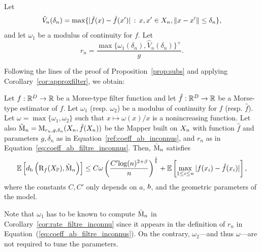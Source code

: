 Let 
\begin{equation}
\hat V_n(\delta_n)=\max\{|\hat f(x)-\hat f(x')|\, :\, x,x'\in X_n, \|x-x'\|\leq\delta_n\},
\end{equation}
 and let
$\omega_1$ be a modulus of continuity for $f$. Let 
\begin{equation}\label{eq:coeff_ab_filtre_inconnus}
r_n=\frac{\max\{\omega_1(\delta_n),\hat V_n(\delta_n)\}^+}{g}.
\end{equation}

Following the lines of the proof of Proposition~\ref{prop:subs} and applying Corollary~\ref{cor:approxfilter}, we obtain:

\begin{cor}\label{cor:rate_filtre_inconnu}
Let $f:\mathbb{R}^D \rightarrow \mathbb{R} $ be a Morse-type filter function  and let $\hat f: \mathbb{R}^D \rightarrow \mathbb{R}$ be a Morse-type estimator of $f$. 
Let  $\omega_1$  (resp. $\omega_2$) be a modulus of continuity for $f$ (resp. $\hat f$).
Let $\omega=\max\{\omega_1,\omega_2\}$ such that 
$x\mapsto \omega(x)/x$ is a nonincreasing function. 
Let also  $\hat{\mathrm{M}}_n  =   \mathrm{M}_{r_n,g,\delta_n} (X_n, \hat f(X_n))$  be the Mapper built on $X_n$ 
with function $\hat f$  and parameters $g,\delta_n$  as in Equation~\eqref{ref:coeff_ab_inconnus},
and $r_n$ as in Equation~\eqref{eq:coeff_ab_filtre_inconnus}. 
Then, $\hat{\mathrm{M}}_n$ satisfies
\begin{equation*}
\label{risk_estimated_filter}
 \mathbb{E}\left[  d_{\rm b}\left(\mathrm{R}_f(X_{\mathbb{P}}),  \hat{\mathrm{M}}_n  \right)\right]
\leq C\omega\left(\frac{C'{\log}(n)^{2+\beta}}{n}\right)^{\frac 1 {b}} 
+  \mathbb{E} \left[\max_{1\leq i \leq n } | f(x_i) - \hat f (x_i)| \right],
\end{equation*}
where the constants  $C,C'$ only depends on $a$, $b$, and the geometric parameters of the model.
\end{cor}

Note that $\omega_1$ has to be known to compute $\hat{\mathrm{M}}_n$ in Corollary~\ref{cor:rate_filtre_inconnu} 
since it appears in the definition of $r_n$ in Equation~(\ref{eq:coeff_ab_filtre_inconnus}). 
On the contrary, $\omega_2$---and thus $\omega$---are not required to tune the parameters.


